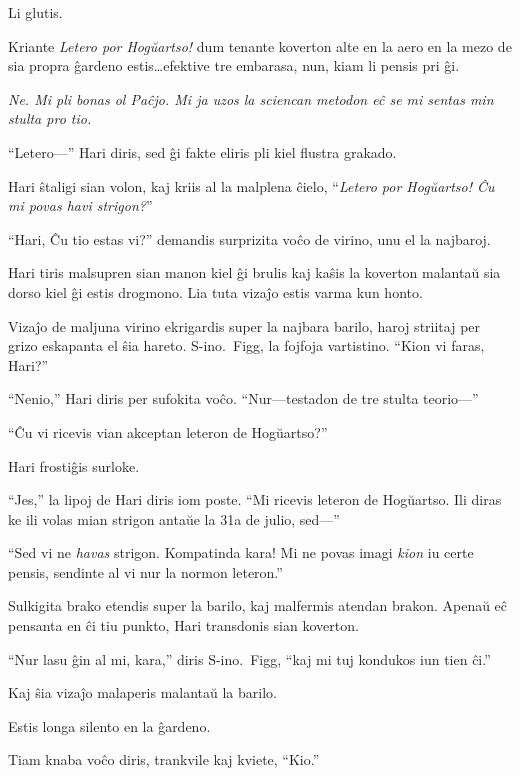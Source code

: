 Li glutis.

Kriante \emph{Letero por Hogŭartso!} dum tenante koverton alte en la aero en la mezo de sia propra ĝardeno estis…efektive tre embarasa, nun, kiam li pensis pri ĝi.

\emph{Ne.
Mi pli bonas ol Paĉjo.
Mi ja uzos la sciencan metodon eĉ se mi sentas min stulta pro tio.}

“Letero—” Hari diris, sed ĝi fakte eliris pli kiel flustra grakado.

Hari ŝtaligi sian volon, kaj kriis al la malplena ĉielo, “\emph{Letero por Hogŭartso!
Ĉu mi povas havi strigon?}”

“Hari, Ĉu tio estas vi?” demandis surprizita voĉo de virino, unu el la najbaroj.

Hari tiris malsupren sian manon kiel ĝi brulis kaj kaŝis la koverton malantaŭ sia dorso kiel ĝi estis drogmono.
Lia tuta vizaĵo estis varma kun honto.

Vizaĵo de maljuna virino ekrigardis super la najbara barilo, haroj striitaj per grizo eskapanta el ŝia hareto.
S\nobreakdash-ino.~Figg, la fojfoja vartistino.
“Kion vi faras, Hari?”

“Nenio,” Hari diris per sufokita voĉo.
“Nur—testadon de tre stulta teorio—”

“Ĉu vi ricevis vian akceptan leteron de Hogŭartso?”

Hari frostiĝis surloke.

“Jes,” la lipoj de Hari diris iom poste.
“Mi ricevis leteron de Hogŭartso.
Ili diras ke ili volas mian strigon antaŭe la 31a de julio, sed—”

“Sed vi ne \emph{havas} strigon.
Kompatinda kara!
Mi ne povas imagi \emph{kion} iu certe pensis, sendinte al vi nur la normon leteron.”

Sulkigita brako etendis super la barilo, kaj malfermis atendan brakon.
Apenaŭ eĉ pensanta en ĉi tiu punkto, Hari transdonis sian koverton.

“Nur lasu ĝin al mi, kara,” diris S\nobreakdash-ino.~Figg, “kaj mi tuj kondukos iun tien ĉi.”

Kaj ŝia vizaĵo malaperis malantaŭ la barilo.

Estis longa silento en la ĝardeno.

Tiam knaba voĉo diris, trankvile kaj kviete, “Kio.”

